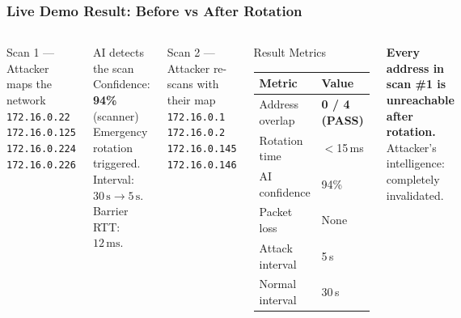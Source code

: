 \documentclass{beamer}
\begin{document}
\begin{frame}
\frametitle{Live Demo Result: Before vs After Rotation}

\begin{columns}


\begin{exampleblock}{Scan 1 --- Attacker maps the network}
\texttt{172.16.0.22}\\
\texttt{172.16.0.125}\\
\texttt{172.16.0.224}\\
\texttt{172.16.0.226}
\end{exampleblock}

\begin{alertblock}{AI detects the scan}
Confidence: \textbf{94\%} (scanner)\\
Emergency rotation triggered.\\
Interval: $30\,\text{s} \to 5\,\text{s}$.\\
Barrier RTT: $12\,\text{ms}$.
\end{alertblock}

\begin{exampleblock}{Scan 2 --- Attacker re-scans with their map}
\texttt{172.16.0.1}\\
\texttt{172.16.0.2}\\
\texttt{172.16.0.145}\\
\texttt{172.16.0.146}
\end{exampleblock}

\begin{block}{Result Metrics}
\begin{tabular}{ll}
\toprule
\textbf{Metric} & \textbf{Value} \\
\midrule
Address overlap & \textbf{0 / 4 (PASS)} \\
Rotation time & $<$15\,ms \\
AI confidence & 94\% \\
Packet loss & None \\
Attack interval & 5\,s \\
Normal interval & 30\,s \\
\bottomrule
\end{tabular}
\end{block}

\vspace{10pt}
\large\centering
\textbf{Every address in scan \#1 is unreachable after rotation.}\\
\normalsize Attacker's intelligence: completely invalidated.

\end{columns}

\end{frame}
\end{document}
